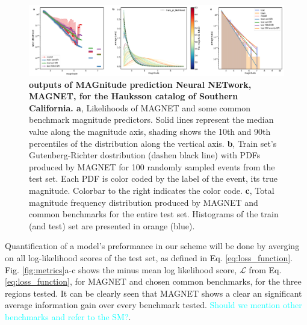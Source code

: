 \documentclass[pdflatex]{sn-jnl}
\newcommand{\neri}[1]{{\textcolor{cyan}{#1}}}
\begin{document}
\begin{figure}[h!]
    \centering
    \includegraphics[width=1\textwidth]{figures/raw_results_hauksson.pdf}
    \caption{
        \textbf{outputs of MAGnitude prediction Neural NETwork, MAGNET, for the Hauksson catalog of Southern California. a}, Likelihoods of MAGNET and some common benchmark magnitude predictors. Solid lines represent the median value along the magnitude axis, shading shows the 10th and 90th percentiles of the distribution along the vertical axis. \textbf{b}, Train set's Gutenberg-Richter dostribution (dashen black line) with PDFs produced by MAGNET for 100 randomly sampled events from the test set. Each PDF is color coded by the label of the event, its true magnitude. Colorbar to the right indicates the color code. \textbf{c}, Total magnitude frequency distribution produced by MAGNET and common benchmarks for the entire test set. Histograms of the train (and test) set are presented in orange (blue).
    }
    \label{fig:model_output}
\end{figure}


Quantification of a model's preformance in our scheme will be done by averging on all log-likelihood scores of the test set, as defined in Eq. \ref{eq:loss_function}. Fig. \ref{fig:metrics}a-c shows the minus mean log likelihood score, $\mathcal{L}$ from Eq. \ref{eq:loss_function}, for MAGNET and chosen common benchmarks, for the three regions tested. It can be clearly seen that MAGNET shows a clear an significant average information gain over every benchmark tested. \neri{Should we mention other benchmarks and refer to the SM?}. 
\end{document}
